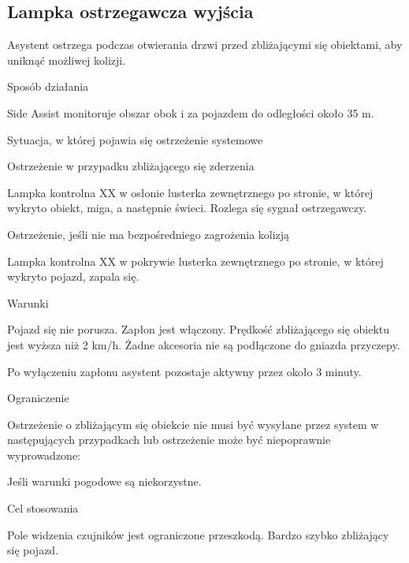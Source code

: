 \subsection{Lampka ostrzegawcza wyjścia}

Asystent ostrzega podczas otwierania drzwi przed zbliżającymi się obiektami, aby uniknąć możliwej kolizji.

Sposób działania

Side Assist monitoruje obszar obok i za pojazdem do odległości około 35 m.

Sytuacja, w której pojawia się ostrzeżenie systemowe

Ostrzeżenie w przypadku zbliżającego się zderzenia


\begin{itemizeTriangle}
	\itemTriangle Lampka kontrolna XX w osłonie lusterka zewnętrznego po stronie, w której wykryto obiekt, miga, a następnie świeci.
	\itemTriangle Rozlega się sygnał ostrzegawczy.
\end{itemizeTriangle}

Ostrzeżenie, jeśli nie ma bezpośredniego zagrożenia kolizją

\begin{itemizeTriangle}
	\itemTriangle Lampka kontrolna XX w pokrywie lusterka zewnętrznego po stronie, w której wykryto pojazd, zapala się.
\end{itemizeTriangle}

Warunki
\begin{itemizeTick}
	\itemTick Pojazd się nie porusza.
	\itemTick Zapłon jest włączony.
	\itemTick Prędkość zbliżającego się obiektu jest wyższa niż 2 km/h.
	\itemTick Żadne akcesoria nie są podłączone do gniazda przyczepy.
\end{itemizeTick}
Po wyłączeniu zapłonu asystent pozostaje aktywny przez około 3 minuty.

Ograniczenie

Ostrzeżenie o zbliżającym się obiekcie nie musi być wysyłane przez system w następujących przypadkach lub ostrzeżenie może być niepoprawnie wyprowadzone:
\begin{itemizeTriangle}
	\itemTriangle Jeśli warunki pogodowe są niekorzystne.
\end{itemizeTriangle}

Cel stosowania
\begin{itemizeTriangle}
	\itemTriangle Pole widzenia czujników jest ograniczone przeszkodą.
	\itemTriangle Bardzo szybko zbliżający się pojazd.
\end{itemizeTriangle}

